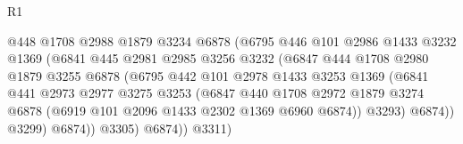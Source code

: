 \begin{lexlean}{R1}
\begin{coremodule}
                                    @448
                                    @1708
                                    @2988
                                    @1879
                                    @3234
                                    @6878
                                    (@6795
                                      @446
                                      @101
                                      @2986
                                      @1433
                                      @3232
                                      @1369
                                      (@6841
                                        @445
                                        @2981
                                        @2985
                                        @3256
                                        @3232
                                        (@6847
                                          @444
                                          @1708
                                          @2980
                                          @1879
                                          @3255
                                          @6878
                                          (@6795
                                            @442
                                            @101
                                            @2978
                                            @1433
                                            @3253
                                            @1369
                                            (@6841
                                              @441
                                              @2973
                                              @2977
                                              @3275
                                              @3253
                                              (@6847
                                                @440
                                                @1708
                                                @2972
                                                @1879
                                                @3274
                                                @6878
                                                (@6919 @101 @2096 @1433 @2302 @1369 @6960 @6874))
                                              @3293)
                                            @6874))
                                        @3299)
                                      @6874))
                                  @3305)
                                @6874))
                            @3311)

\end{coremodule}
\end{lexlean}
